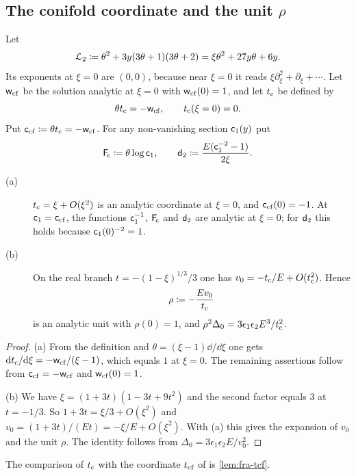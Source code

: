 \subsection{The conifold coordinate and the unit \texorpdfstring{$\rho$}{rho}}
\label{sec:set-coord}

Let
\[
\mathcal{L}_{2}\coloneqq\theta^2+3y(3\theta+1)(3\theta+2)=\xi\theta^2+27y\theta+6y.
\]
Its exponents at $\xi=0$ are $(0,0)$, because near $\xi=0$ it reads $\xi\partial_\xi^2+\partial_\xi+\cdots$. Let $\mathsf{w}_{\mathrm{cf}}$ be the solution analytic at $\xi=0$ with $\mathsf{w}_{\mathrm{cf}}(0)=1$, and let $t_{\mathrm{c}}$ be defined by
\[
\theta t_{\mathrm{c}}=-\mathsf{w}_{\mathrm{cf}},\qquad t_{\mathrm{c}}(\xi=0)=0.
\]
Put $\mathsf{c}_{\mathrm{cf}}\coloneqq\theta t_{\mathrm{c}}=-\mathsf{w}_{\mathrm{cf}}$. For any non-vanishing section $\mathsf{c}_{1}(y)$ put
\[
\mathsf{F}_{\!\mathsf{c}}\coloneqq\theta\log\mathsf{c}_{1},\qquad\mathsf{d}_{2}\coloneqq\frac{E(\mathsf{c}_{1}^{-2}-1)}{2\xi}.
\]

\begin{lem}
\label{lem:set-coord}
\begin{description}
\item[(a)] $t_{\mathrm{c}}=\xi+O(\xi^2)$ is an analytic coordinate at $\xi=0$, and $\mathsf{c}_{\mathrm{cf}}(0)=-1$. At $\mathsf{c}_{1}=\mathsf{c}_{\mathrm{cf}}$, the functions $\mathsf{c}_{1}^{-1}$, $\mathsf{F}_{\!\mathsf{c}}$ and $\mathsf{d}_{2}$ are analytic at $\xi=0$; for $\mathsf{d}_{2}$ this holds because $\mathsf{c}_{1}(0)^{-2}=1$.
\item[(b)] On the real branch $t=-(1-\xi)^{1/3}/3$ one has $v_0=-t_{\mathrm{c}}/E+O(t_{\mathrm{c}}^2)$. Hence
\[
\rho\coloneqq-\frac{Ev_0}{t_{\mathrm{c}}}
\]
is an analytic unit with $\rho(0)=1$, and $\rho^2\Delta_0=3\epsilon_1\epsilon_2E^3/t_{\mathrm{c}}^2$.
\end{description}
\end{lem}

\begin{proof}
(a) From the definition and $\theta=(\xi-1)\dd/\dd\xi$ one gets $\mathrm{d}t_{\mathrm{c}}/\mathrm{d}\xi=-\mathsf{w}_{\mathrm{cf}}/(\xi-1)$, which equals $1$ at $\xi=0$. The remaining assertions follow from $\mathsf{c}_{\mathrm{cf}}=-\mathsf{w}_{\mathrm{cf}}$ and $\mathsf{w}_{\mathrm{cf}}(0)=1$.

(b) We have $\xi=(1+3t)(1-3t+9t^2)$ and the second factor equals $3$ at $t=-1/3$. So $1+3t=\xi/3+O(\xi^2)$ and $v_0=(1+3t)/(Et)=-\xi/E+O(\xi^2)$. With (a) this gives the expansion of $v_0$ and the unit $\rho$. The identity follows from $\Delta_0=3\epsilon_1\epsilon_2E/v_0^2$.
\end{proof}

The comparison of $t_{\mathrm{c}}$ with the coordinate $t_{\mathrm{cf}}$ of \cite{BS} is \cref{lem:fra-tcf}.

